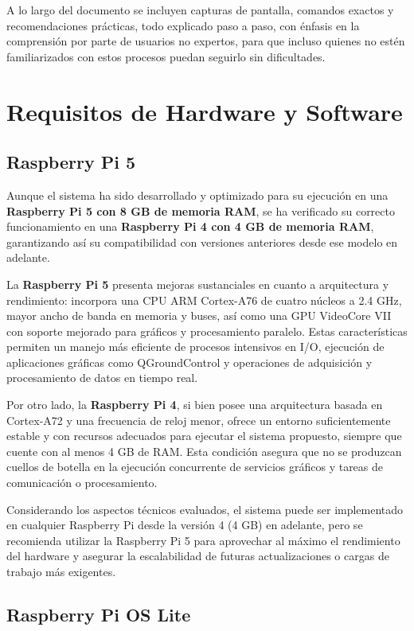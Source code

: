 \documentclass[12pt]{article}
\begin{document}
A lo largo del documento se incluyen capturas de pantalla, comandos exactos y recomendaciones prácticas, todo explicado paso a paso, con énfasis en la comprensión por parte de usuarios no expertos, para que incluso quienes no estén familiarizados con estos procesos puedan seguirlo sin dificultades.

\newpage
\tableofcontents

\newpage
\section{Requisitos de Hardware y Software}
\subsection{Raspberry Pi 5}

Aunque el sistema ha sido desarrollado y optimizado para su ejecución en una \textbf{Raspberry Pi 5 con 8 GB de memoria RAM}, se ha verificado su correcto funcionamiento en una \textbf{Raspberry Pi 4 con 4 GB de memoria RAM}, garantizando así su compatibilidad con versiones anteriores desde ese modelo en adelante.

La \textbf{Raspberry Pi 5} presenta mejoras sustanciales en cuanto a arquitectura y rendimiento: incorpora una CPU ARM Cortex-A76 de cuatro núcleos a 2.4 GHz, mayor ancho de banda en memoria y buses, así como una GPU VideoCore VII con soporte mejorado para gráficos y procesamiento paralelo. Estas características permiten un manejo más eficiente de procesos intensivos en I/O, ejecución de aplicaciones gráficas como QGroundControl y operaciones de adquisición y procesamiento de datos en tiempo real.

Por otro lado, la \textbf{Raspberry Pi 4}, si bien posee una arquitectura basada en Cortex-A72 y una frecuencia de reloj menor, ofrece un entorno suficientemente estable y con recursos adecuados para ejecutar el sistema propuesto, siempre que cuente con al menos 4 GB de RAM. Esta condición asegura que no se produzcan cuellos de botella en la ejecución concurrente de servicios gráficos y tareas de comunicación o procesamiento.

Considerando los aspectos técnicos evaluados, el sistema puede ser implementado en cualquier Raspberry Pi desde la versión 4 (4 GB) en adelante, pero se recomienda utilizar la Raspberry Pi 5 para aprovechar al máximo el rendimiento del hardware y asegurar la escalabilidad de futuras actualizaciones o cargas de trabajo más exigentes.

\subsection{Raspberry Pi OS Lite}
\end{document}
